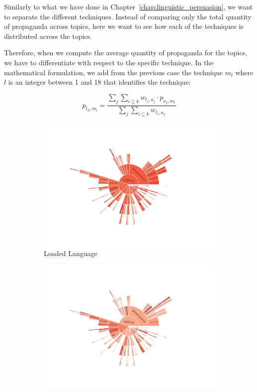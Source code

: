 Similarly to what we have done in Chapter~\ref{chap:linguistic_persuasion}, we want to separate the different techniques. Instead of comparing only the total quantity of propaganda across topics, here we want to see how each of the techniques is distributed across the topics. 

Therefore, when we compute the average quantity of propaganda for the topics, we have to differentiate with respect to the specific technique. In the mathematical formulation, we add from the previous case the technique $m_{l}$ where $l$ is an integer between 1 and 18 that identifies the technique:

$$ p_{t_{k},m_{l}} = \frac{ \sum_{j} \sum_{i\subseteq k} w_{t_{i},a_{j}} \cdot p_{a_{j},m_{l}} }{ \sum_{j} \sum_{i\subseteq k} w_{t_{i},a_{j}} } $$


\begin{figure}[!htbp]
    \centering
	\begin{subfigure}{0.45\textwidth}
		\includegraphics[trim={2.2cm 2cm 2.2cm 2cm},clip,width=\linewidth]{figures/baly_iptc_weighted_prop_tech_Loaded_Language.pdf}
		\caption{Loaded Language}
            \label{fig:baly_iptc_weighted_prop_tech_Loaded_Language}
	\end{subfigure}
	\begin{subfigure}{0.45\textwidth}
		\includegraphics[trim={2.2cm 2cm 2.2cm 2cm},clip,width=\linewidth]{figures/baly_iptc_weighted_prop_tech_Doubt.pdf}

\end{subfigure}
\end{figure}
